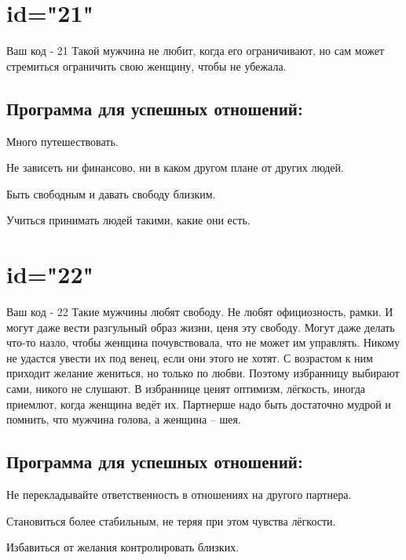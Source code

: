 \section{id="21"}{Ваш код - 21}
Такой мужчина не любит, когда его ограничивают, но сам может 
стремиться ограничить свою женщину, чтобы не убежала.
\subsection{Программа для успешных отношений:}
\item Много путешествовать.
\item Не зависеть ни финансово, ни в каком другом плане от других 
людей.
\item Быть свободным и давать свободу близким.
\item Учиться принимать людей такими, какие они есть.
\endsubsection
\endsection

\section{id="22"}{Ваш код - 22}
Такие мужчины любят свободу. Не любят официозность, рамки. И могут 
даже вести разгульный образ жизни, ценя эту свободу. Могут даже 
делать что-то назло, чтобы женщина почувствовала, что не может им 
управлять. Никому не удастся увести их под венец, если они этого 
не хотят. С возрастом к ним приходит желание жениться, но только 
по любви. Поэтому избранницу выбирают сами, никого не слушают. 
В избраннице ценят оптимизм, лёгкость, иногда приемлют, когда 
женщина ведёт их. Партнерше надо быть достаточно мудрой и помнить, 
что мужчина голова, а женщина – шея.
\subsection{Программа для успешных отношений:}
\item Не перекладывайте ответственность в отношениях на другого 
партнера.
\item Становиться более стабильным, не теряя при этом чувства лёгкости.
\item Избавиться от желания контролировать близких.
\endsubsection
\endsection
